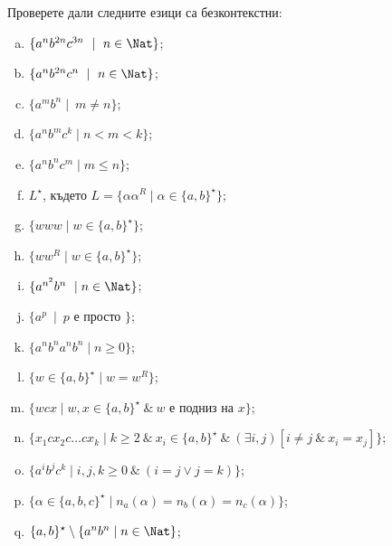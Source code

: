 \begin{problem}
  Проверете дали следните езици са безконтекстни:
  \begin{enumerate}[a)]
  \item
    $\{a^nb^{2n}c^{3n}\ \mid\ n\in\Nat\}$;
  \item
    $\{a^nb^{2n}c^{n}\ \mid\ n\in\Nat\}$;
  \item
    $\{a^mb^n\mid\ m \neq n\}$;
  \item
    $\{a^nb^mc^k\mid n < m < k\}$;
  \item
    $\{a^nb^nc^m\mid m \leq n\}$;
  \item
    $L^\star$, където
    $L = \{\alpha\alpha^R \mid \alpha \in \{a,b\}^\star\}$;
  \item
    $\{www\mid w\in \{a,b\}^\star\}$;
  \item
    $\{ww^R\mid w\in \{a,b\}^\star\}$;
  \item
    $\{a^{n^2}b^n\ \mid n \in \Nat\}$;
  \item
    $\{a^p\ \mid\ p\mbox{ е просто }\}$;
  \item
    $\{a^nb^na^nb^n\mid n\geq 0\}$;
  \item
    $\{w \in \{a,b\}^\star \mid w = w^R\}$;
  \item
    $\{w c x\mid w,x\in \{a,b\}^\star\ \&\ w\mbox{ е подниз на }x\}$;
  \item
    $\{x_1 c x_2 c \dots c x_k\mid k\geq 2\ \&\ x_i\in\{a,b\}^\star\ \&\ (\exists i,j)[i \neq j\ \&\ x_i = x_j]\}$;
  \item
    $\{a^ib^jc^k\mid i,j,k\geq 0\ \&\ (i = j \vee j = k)\}$;
  \item
    $\{\alpha \in \{a,b,c\}^\star\mid n_a(\alpha) = n_b(\alpha) = n_c(\alpha)\}$;
  \item
    $\{a,b\}^\star \setminus \{a^nb^n\mid n\in \Nat\}$;
  \end{enumerate}
\end{problem}
